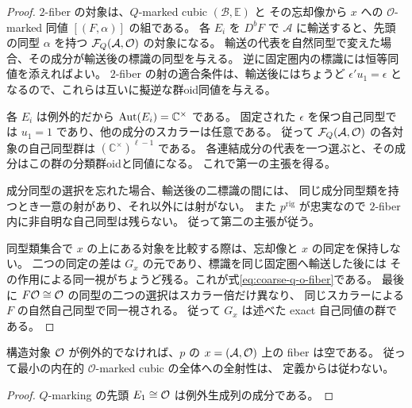 \begin{proof}
$2$-fiber の対象は、$Q$-marked cubic $(\mathcal B,\mathbb E)$ と
その忘却像から $x$ への $\mathcal O$-marked 同値 $[(F,\alpha)]$ の組である。
各 $E_i$ を $D^bF$ で $\mathcal A$ に輸送すると、先頭の同型 $\alpha$ を持つ
$\mathcal F_Q(\mathcal A,\mathcal O)$ の対象になる。
輸送の代表を自然同型で変えた場合、その成分が輸送後の標識の同型を与える。
逆に固定圏内の標識には恒等同値を添えればよい。
$2$-fiber の射の適合条件は、輸送後にはちょうど
$\epsilon'u_1=\epsilon$ となるので、これらは互いに擬逆な群oid同値を与える。

各 $E_i$ は例外的だから $\operatorname{Aut}(E_i)=\mathbb C^\times$ である。
固定された $\epsilon$ を保つ自己同型では $u_1=1$ であり、他の成分のスカラーは任意である。
従って $\mathcal F_Q(\mathcal A,\mathcal O)$ の各対象の自己同型群は
$(\mathbb C^\times)^{\ell-1}$ である。
各連結成分の代表を一つ選ぶと、その成分はこの群の分類群oidと同値になる。
これで第一の主張を得る。

成分同型の選択を忘れた場合、輸送後の二標識の間には、
同じ成分同型類を持つとき一意の射があり、それ以外には射がない。
また $p^{\mathrm{rig}}$ が忠実なので $2$-fiber 内に非自明な自己同型は残らない。
従って第二の主張が従う。

同型類集合で $x$ の上にある対象を比較する際は、忘却像と $x$ の同定を保持しない。
二つの同定の差は $G_x$ の元であり、標識を同じ固定圏へ輸送した後には
その作用による同一視がちょうど残る。これが式\eqref{eq:coarse-q-o-fiber}である。
最後に $F\mathcal O\cong\mathcal O$ の同型の二つの選択はスカラー倍だけ異なり、
同じスカラーによる $F$ の自然自己同型で同一視される。
従って $G_x$ は述べた exact 自己同値の群である。
\end{proof}

\begin{corollary}[像の必要条件]\label{cor:q-marking-image-obstruction}
構造対象 $\mathcal O$ が例外的でなければ、$p$ の $x=(\mathcal A,\mathcal O)$ 上の fiber は空である。
従って最小の内在的 $\mathcal O$-marked cubic の全体への全射性は、
定義からは従わない。
\end{corollary}
\begin{proof}
$Q$-marking の先頭 $E_1\cong\mathcal O$ は例外生成列の成分である。
\end{proof}

